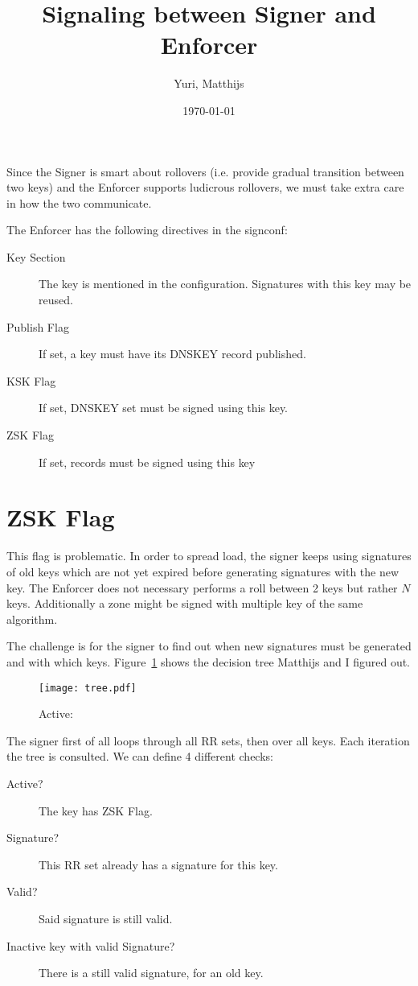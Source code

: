\documentclass[twoside, a4paper]{article}
\title{Signaling between Signer and Enforcer}
\author{Yuri, Matthijs}
\date{\today}
\begin{document}
\maketitle

Since the Signer is smart about rollovers (i.e. provide gradual 
transition between two keys) and the Enforcer supports ludicrous 
rollovers, we must take extra care in how the two communicate.

The Enforcer has the following directives in the signconf:

\begin{description}
\item[Key Section] The key is mentioned in the configuration. 
Signatures with this key may be reused.
\item[Publish Flag] If set, a key must have its DNSKEY record
published.
\item[KSK Flag] If set, DNSKEY set must be signed using this key.
\item[ZSK Flag] If set, records must be signed using this key
\end{description}

\section{ZSK Flag}

This flag is problematic. In order to spread load, the signer keeps 
using signatures of old keys which are not yet expired before generating
signatures with the new key. 
The Enforcer does not necessary performs a roll between 2 keys but
rather $N$ keys. Additionally a zone might be signed with multiple key
of the same algorithm.

The challenge is for the signer to find out when new signatures must be 
generated and with which keys. Figure~\ref{fig:tree} shows the 
decision tree Matthijs and I figured out.

\begin{figure}[h]
\centering
\texttt{[image: tree.pdf]}
\caption{Active:}
\label{fig:tree}
\end{figure}

The signer first of all loops through all RR sets, then over all keys.
Each iteration the tree is consulted. We can define 4 different checks:

\begin{description}
\item[Active?] The key has ZSK Flag.
\item[Signature?] This RR set already has a signature for this key.
\item[Valid?] Said signature is still valid.
\item[Inactive key with valid Signature?] There is a still valid 
signature, for an old key.
\end{description}
\end{document}
